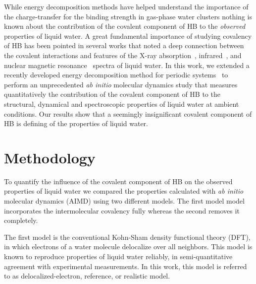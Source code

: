 \documentclass[aps,prl,reprint,amsmath,amssymb]{revtex4-1}
\begin{document}

While energy decomposition methods have helped understand the importance of the charge-transfer for the binding strength in gas-phase water clusters nothing is known about the contribution of the covalent component of HB to the \emph{observed} properties of liquid water. 
A great fundamental importance of studying covalency of HB has been pointed in several works that noted a deep connection between the covalent interactions and features of the X-ray absorption~\cite{NatureComm2013}, infrared~\cite{JPCL2013}, and nuclear magnetic resonance~\cite{NatureComm2015} spectra of liquid water. 
In this work, we extended a recently developed energy decomposition method for periodic systems~\cite{Khaliullin2013JCTC} to perform an unprecedented \emph{ab initio} molecular dynamics study that measures quantitatively the contribution of the covalent component of HB to the structural, dynamical and spectroscopic properties of liquid water at ambient conditions. 
Our results show that a seemingly insignificant covalent component of HB is defining of the properties of liquid water. 



\section{Methodology}

To quantify the influence of the covalent component of HB on the observed properties of liquid water we compared the properties calculated with \emph{ab initio} molecular dynamics (AIMD) using two different models. 
The first model model incorporates the intermolecular covalency fully whereas the second removes it completely.

The first model is the conventional Kohn-Sham density functional theory (DFT), in which electrons of a water molecule delocalize over all neighbors. 
This model is known to reproduce properties of liquid water reliably, in semi-quantitative agreement with experimental measurements. 
In this work, this model is referred to as delocalized-electron, reference, or realistic model. 
\end{document}
